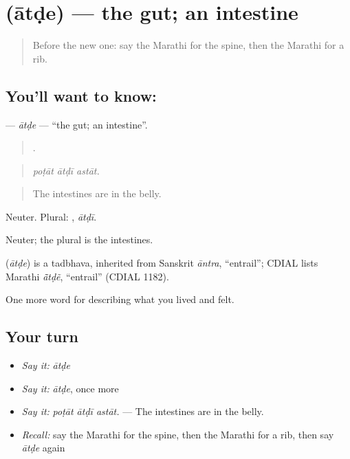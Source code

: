 \section[\texorpdfstring{\mr{आतडे} (ātḍe)}{आतडे (ātḍe)}]{ (ātḍe) — the gut; an intestine}

\label{lesson:MR-C478-atde}



\begin{quote}
Before the new one: say the Marathi for the spine, then the Marathi for a rib.
\end{quote}

\subsection*{You'll want to know: }
\textbf{} — \emph{ātḍe} — \textquotedblleft{}the gut; an intestine\textquotedblright{}.

\begin{quote}
  .
\end{quote}

\begin{quote}
\emph{poṭāt ātḍī astāt.}
\end{quote}

\begin{quote}
The intestines are in the belly.
\end{quote}

Neuter. Plural: , \emph{ātḍī}.

Neuter; the plural  is the intestines.

\begin{cousinweb}
\textbf{} (\emph{ātḍe}) is a tadbhava, inherited from Sanskrit \emph{āntra}, \textquotedblleft{}entrail\textquotedblright{}; CDIAL lists Marathi \emph{ā̃tḍẽ}, \textquotedblleft{}entrail\textquotedblright{} (CDIAL 1182).
\end{cousinweb}

\begin{grammarlens}[title={What you've built}]
One more word for describing what you lived and felt.
\end{grammarlens}

\subsection*{Your turn}
\begin{itemize}
\raggedright
  \item \emph{Say it:} \emph{ātḍe}
  \item \emph{Say it:} \emph{ātḍe}, once more
  \item \emph{Say it:} \emph{poṭāt ātḍī astāt.} — The intestines are in the belly.
  \item \emph{Recall:} say the Marathi for the spine, then the Marathi for a rib, then say \emph{ātḍe} again
\end{itemize}

